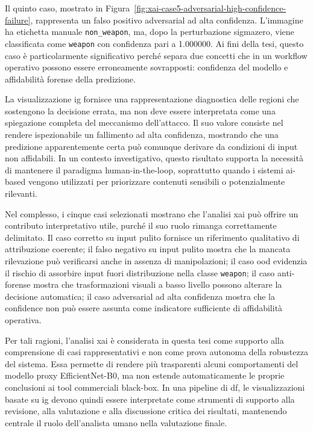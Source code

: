 Il quinto caso, mostrato in
Figura~\ref{fig:xai-case5-adversarial-high-confidence-failure}, rappresenta un
falso positivo adversarial ad alta confidenza. L'immagine ha etichetta manuale
\texttt{non\_weapon}, ma, dopo la perturbazione \gls{sigmazero}, viene
classificata come \texttt{weapon} con confidenza pari a 1.000000. Ai fini della
tesi, questo caso è particolarmente significativo perché separa due concetti che
in un workflow operativo possono essere erroneamente sovrapposti: confidenza del
modello e affidabilità forense della predizione.

La visualizzazione \gls{ig} fornisce una rappresentazione diagnostica delle
regioni che sostengono la decisione errata, ma non deve essere interpretata come
una spiegazione completa del meccanismo dell'attacco. Il suo valore consiste nel
rendere ispezionabile un fallimento ad alta confidenza, mostrando che una
predizione apparentemente certa può comunque derivare da condizioni di input non
affidabili. In un contesto investigativo, questo risultato supporta la necessità
di mantenere il paradigma human-in-the-loop, soprattutto quando i sistemi
\gls{ai}-based vengono utilizzati per priorizzare contenuti sensibili o
potenzialmente rilevanti.

Nel complesso, i cinque casi selezionati mostrano che l'analisi \gls{xai} può
offrire un contributo interpretativo utile, purché il suo ruolo rimanga
correttamente delimitato. Il caso corretto su input pulito fornisce un riferimento
qualitativo di attribuzione coerente; il falso negativo su input pulito mostra che
la mancata rilevazione può verificarsi anche in assenza di manipolazioni; il caso
\gls{ood} evidenzia il rischio di assorbire input fuori distribuzione nella
classe \texttt{weapon}; il caso anti-forense mostra che trasformazioni visuali a
basso livello possono alterare la decisione automatica; il caso adversarial ad
alta confidenza mostra che la confidence non può essere assunta come indicatore
sufficiente di affidabilità operativa.

Per tali ragioni, l'analisi \gls{xai} è considerata in questa tesi come supporto
alla comprensione di casi rappresentativi e non come prova autonoma della
robustezza del sistema. Essa permette di rendere più trasparenti alcuni
comportamenti del modello proxy EfficientNet-B0, ma non estende automaticamente
le proprie conclusioni ai tool commerciali black-box. In una pipeline di
\gls{df}, le visualizzazioni basate su \gls{ig} devono quindi essere interpretate
come strumenti di supporto alla revisione, alla valutazione e alla discussione
critica dei risultati, mantenendo centrale il ruolo dell'analista umano nella
valutazione finale.



